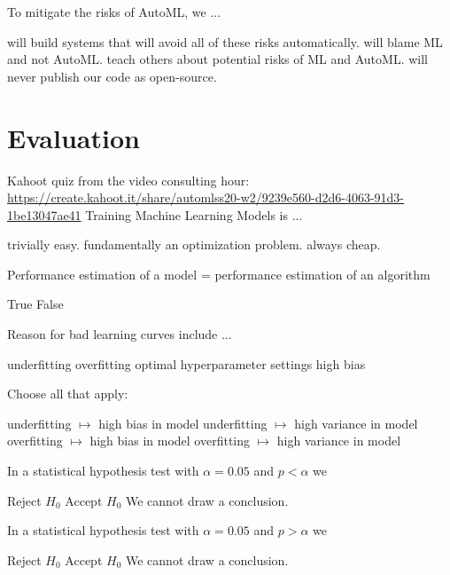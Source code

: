 \documentclass{exam}
\begin{document}
\begin{questions}
		\question To mitigate the risks of AutoML, we ...
		\begin{choices}
			\choice will build systems that will avoid all of these risks automatically.
			\choice will blame ML and not AutoML.
			\choice teach others about potential risks of ML and AutoML.
			\choice will never publish our code as open-source.
		\end{choices}
		
		\pagebreak
		\section{Evaluation}
		Kahoot quiz from the video consulting hour: \url{https://create.kahoot.it/share/automlss20-w2/9239e560-d2d6-4063-91d3-1be13047ae41}
		\question Training Machine Learning Models is ...
		\begin{choices}
			\choice trivially easy.
			\choice fundamentally an optimization problem. %
			\choice always cheap.
		\end{choices}
		
		\question Performance estimation of a model = performance estimation of an algorithm
		\begin{choices}
			\choice True
			\choice False %
		\end{choices}
		
		\question Reason for bad learning curves include ...
		\begin{choices}
			\choice underfitting %
			\choice overfitting %
			\choice optimal hyperparameter settings
			\choice high bias   %
		\end{choices}
		
		\question Choose all that apply:
		\begin{choices}
			\choice underfitting $\mapsto$ high bias in model %
			\choice underfitting $\mapsto$ high variance in model
			\choice overfitting $\mapsto$ high bias in model
			\choice overfitting $\mapsto$ high variance in model %
		\end{choices}
		
		\question In a statistical hypothesis test with $\alpha = 0.05$ and $p < \alpha$ we
		\begin{choices}
			\choice Reject $H_0$ %
			\choice Accept $H_0$
			\choice We cannot draw a conclusion.
		\end{choices}
		
		\question In a statistical hypothesis test with $\alpha = 0.05$ and $p > \alpha$ we
		\begin{choices}
			\choice Reject $H_0$
			\choice Accept $H_0$
			\choice We cannot draw a conclusion. %
		\end{choices}
		

\end{questions}
\end{document}
